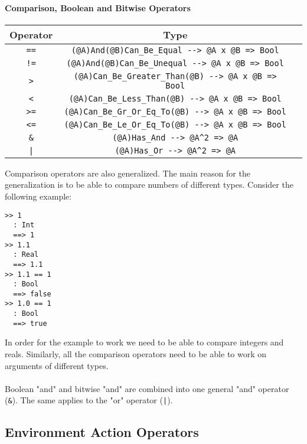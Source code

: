 \documentclass[diploma]{softlab-thesis}
\begin{document}
\paragraph{Comparison, Boolean and Bitwise Operators}

\begin{center}
\begin{tabular}{ |c|c|c| }
\hline
Operator & Type
\\
\hline
\hline
\verb|==| & \verb|(@A)And(@B)Can_Be_Equal --> @A x @B => Bool|
\\
\hline
\verb|!=| & \verb|(@A)And(@B)Can_Be_Unequal --> @A x @B => Bool|
\\
\hline
\verb|>| & \verb|(@A)Can_Be_Greater_Than(@B) --> @A x @B => Bool|
\\
\hline
\verb|<| & \verb|(@A)Can_Be_Less_Than(@B) --> @A x @B => Bool|
\\
\hline
\verb|>=| & \verb|(@A)Can_Be_Gr_Or_Eq_To(@B) --> @A x @B => Bool|
\\
\hline
\verb|<=| & \verb|(@A)Can_Be_Le_Or_Eq_To(@B) --> @A x @B => Bool|
\\
\hline
\verb|&| & \verb|(@A)Has_And --> @A^2 => @A|
\\
\hline
\texttt{|} & \verb|(@A)Has_Or --> @A^2 => @A|
\\
\hline
\end{tabular}
\end{center}
Comparison operators are also generalized. The main reason for the
generalization is to be able to compare numbers of different types. Consider
the following example:

\begin{verbatim}
>> 1
  : Int
  ==> 1
>> 1.1
  : Real
  ==> 1.1
>> 1.1 == 1
  : Bool
  ==> false
>> 1.0 == 1
  : Bool
  ==> true
\end{verbatim}
In order for the example to work we need to be able to compare integers and
reals.  Similarly, all the comparison operators need to be able to work on
arguments of different types.
\\\\
Boolean "and" and bitwise "and" are combined into one general "and" operator
(\verb|&|). The same applies to the "or" operator (\texttt{|}).

\newpage

\subsection{Environment Action Operators}
\label{subsec:envacts}
\end{document}
